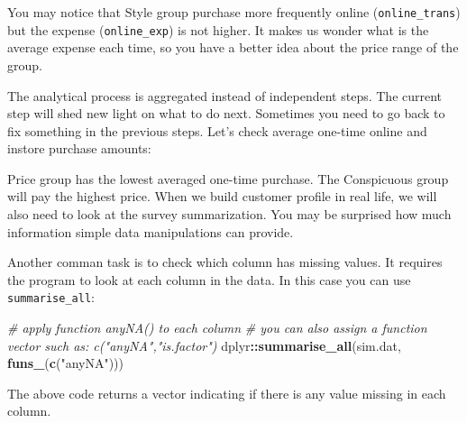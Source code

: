 \documentclass[12pt,]{krantz}
\makeatletter
\newenvironment{Shaded}{\begin{snugshade}}{\end{snugshade}}
\newcommand{\KeywordTok}[1]{\textcolor[rgb]{0.27,0.27,0.27}{\textbf{#1}}}
\newcommand{\DataTypeTok}[1]{\textcolor[rgb]{0.27,0.27,0.27}{#1}}
\newcommand{\DecValTok}[1]{\textcolor[rgb]{0.06,0.06,0.06}{#1}}
\newcommand{\StringTok}[1]{\textcolor[rgb]{0.5,0.5,0.5}{#1}}
\newcommand{\CommentTok}[1]{\textcolor[rgb]{0.37,0.37,0.37}{\textit{#1}}}
\newcommand{\OperatorTok}[1]{\textcolor[rgb]{0.43,0.43,0.43}{\textbf{#1}}}
\newcommand{\NormalTok}[1]{#1}
\newenvironment{kframe}{%
\medskip{}
\setlength{\fboxsep}{.8em}
 \def\at@end@of@kframe{}%
 \ifinner\ifhmode%
  \def\at@end@of@kframe{\end{minipage}}%
  \begin{minipage}{\columnwidth}%
 \fi\fi%
 \def\FrameCommand##1{\hskip\@totalleftmargin \hskip-\fboxsep
 \colorbox{shadecolor}{##1}\hskip-\fboxsep
     \hskip-\linewidth \hskip-\@totalleftmargin \hskip\columnwidth}%
 \MakeFramed {\advance\hsize-\width
   \@totalleftmargin\z@ \linewidth\hsize
   \@setminipage}}%
 {\par\unskip\endMakeFramed%
 \at@end@of@kframe}
\renewenvironment{Shaded}{\begin{kframe}}{\end{kframe}}
\theoremstyle{definition}
\theoremstyle{definition}
\theoremstyle{definition}
\theoremstyle{remark}
\makeatother
\begin{document}
You may notice that Style group purchase more frequently online
(\texttt{online\_trans}) but the expense (\texttt{online\_exp}) is not
higher. It makes us wonder what is the average expense each time, so you
have a better idea about the price range of the group.

The analytical process is aggregated instead of independent steps. The
current step will shed new light on what to do next. Sometimes you need
to go back to fix something in the previous steps. Let's check average
one-time online and instore purchase amounts:

\begin{Shaded}
\end{Shaded}

Price group has the lowest averaged one-time purchase. The Conspicuous
group will pay the highest price. When we build customer profile in real
life, we will also need to look at the survey summarization. You may be
surprised how much information simple data manipulations can provide.

Another comman task is to check which column has missing values. It
requires the program to look at each column in the data. In this case
you can use \texttt{summarise\_all}:

\begin{Shaded}
\begin{Highlighting}[]
\CommentTok{# apply function anyNA() to each column}
\CommentTok{# you can also assign a function vector such as: c("anyNA","is.factor")}
\NormalTok{dplyr}\OperatorTok{::}\KeywordTok{summarise_all}\NormalTok{(sim.dat, }\KeywordTok{funs_}\NormalTok{(}\KeywordTok{c}\NormalTok{(}\StringTok{"anyNA"}\NormalTok{)))}
\end{Highlighting}
\end{Shaded}

The above code returns a vector indicating if there is any value missing
in each column.
\end{document}
